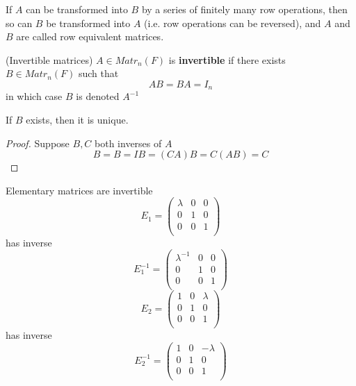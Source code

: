 \begin{definition}
    If $A$ can be transformed into $B$ by a series of finitely many row operations, then so can $B$ be transformed into $A$ (i.e. row operations can be reversed), and $A$ and $B$ are called row equivalent matrices.
\end{definition}

\begin{definition}
    (Invertible matrices) $A \in Matr_n(F)$  is \textbf{invertible} if there exists $B \in Matr_n(F)$ such that 
    \[
        AB = BA = I_n
    \]
    in which case $B$ is denoted $A^{-1}$
\end{definition}

\begin{remark}
    If $B$ exists, then it is unique. 
\end{remark}

\begin{proof}
    Suppose $B, C$ both inverses of $A$
    \[
        B = B = IB = (CA) B = C(AB) = C
    \]
\end{proof}

\begin{example}
    Elementary matrices are invertible 
    \[
        E_1 = \begin{pmatrix} 
        \lambda & 0 & 0 \\
        0 & 1 & 0 \\
        0 & 0 & 1 \\
        \end{pmatrix}
    \]
    has inverse 
    \[
        E_1^{-1} = \begin{pmatrix} 
        \lambda^{-1} & 0 & 0 \\
        0 & 1 & 0 \\
        0 & 0 & 1 \\
        \end{pmatrix}
    \]
    \[
        E_2 = \begin{pmatrix} 
        1 & 0 & \lambda \\
        0 & 1 & 0 \\
        0 & 0 & 1 \\
        \end{pmatrix}
    \]
    has inverse 
    \[
        E_2^{-1} = \begin{pmatrix} 
        1 & 0 & -\lambda \\
        0 & 1 & 0 \\
        0 & 0 & 1 \\
        \end{pmatrix}
    \]
\end{example}

